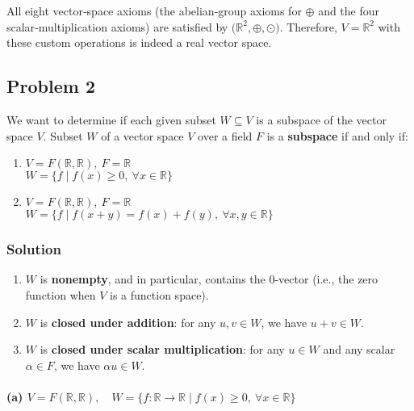 \documentclass[12pt]{article}
\begin{document}
All eight vector‐space axioms (the abelian‐group axioms for \(\oplus\) and the four scalar‐multiplication axioms) are satisfied by \(\bigl(\mathbb{R}^2,\oplus,\odot\bigr)\). Therefore, \( V = \mathbb{R}^2 \) with these custom operations is indeed a real vector space.
\newpage

\subsection*{Problem 2}

We want to determine if each given subset \( W \subseteq V \) is a subspace of the vector space \( V \). Subset \( W \) of a vector space \( V \) over a field \( F \) is a \textbf{subspace} if and only if:

\begin{enumerate}[label=(\alph*)]
    \item \( V = F(\mathbb{R}, \mathbb{R}), \ F = \mathbb{R} \) \\
    \( W = \{ f \mid f(x) \geq 0, \ \forall x \in \mathbb{R} \} \)
    
    \item \( V = F(\mathbb{R}, \mathbb{R}), \ F = \mathbb{R} \) \\
    \( W = \{ f \mid f(x + y) = f(x) + f(y), \ \forall x, y \in \mathbb{R} \} \)
\end{enumerate}

\subsubsection*{Solution}


\begin{enumerate}
    \item \( W \) is \textbf{nonempty}, and in particular, contains the \( 0 \)-vector (i.e., the zero function when \( V \) is a function space).
    \item \( W \) is \textbf{closed under addition}: for any \( u, v \in W \), we have \( u + v \in W \).
    \item \( W \) is \textbf{closed under scalar multiplication}: for any \( u \in W \) and any scalar \( \alpha \in F \), we have \( \alpha u \in W \).
\end{enumerate}

\paragraph{(a) \( V = F(\mathbb{R}, \mathbb{R}),\quad W = \{ f : \mathbb{R} \to \mathbb{R} \mid f(x) \geq 0,\ \forall x \in \mathbb{R} \} \)}
\end{document}

